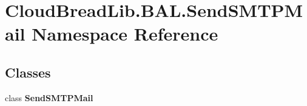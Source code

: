 \hypertarget{a00429}{}\section{Cloud\+Bread\+Lib.\+B\+A\+L.\+Send\+S\+M\+T\+P\+Mail Namespace Reference}
\label{a00429}
\subsection*{Classes}
\begin{DoxyCompactItemize}
\item 
class {\bfseries Send\+S\+M\+T\+P\+Mail}
\end{DoxyCompactItemize}
